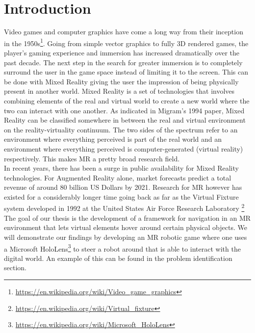 
\chapter{Introduction}
Video games and computer graphics have come a long way from their inception in the 1950s\footnote{\protect\url{https://en.wikipedia.org/wiki/Video\_game\_graphics}}. Going from simple vector graphics to fully 3D rendered games, the player's gaming experience and immersion has increased dramatically over the past decade. The next step in the search for greater immersion is to completely surround the user in the game space instead of limiting it to the screen. This can be done with Mixed Reality giving the user the impression of being physically present in another world.
\newline
Mixed Reality is a set of technologies that involves combining elements of the real and virtual world to create a new world where the two can interact with one another. As indicated in Migram's 1994 paper\cite{milgram1994taxonomy}, Mixed Reality can be classified somewhere in between the real and virtual environment on the reality-virtuality continuum. The two sides of the spectrum refer to an environment where everything perceived is part of the real world and an environment where everything perceived is computer-generated (virtual reality) respectively. This makes MR a pretty broad research field.
\newpage\mbox{}\\
In recent years, there has been a surge in public availability for Mixed Reality technologies. For Augmented Reality alone, market forecasts predict a total revenue of around 80 billion US Dollars by 2021\cite{evans2017evaluating}. Research for MR however has existed for a considerably longer time going back as far as the Virtual Fixture system developed in 1992 at the United States Air Force Research Laboratory \footnote{\protect\url{https://en.wikipedia.org/wiki/Virtual\_fixture}} 
\newline
The goal of our thesis is the development of a framework for navigation in an MR environment that lets virtual elements hover around certain physical objects. We will demonstrate our findings by developing an MR robotic game where one uses a Microsoft HoloLens\footnote{\protect\url{https://en.wikipedia.org/wiki/Microsoft\_HoloLens}} to steer a robot around that is able to interact with the digital world. An example of this can be found in the problem identification section.

